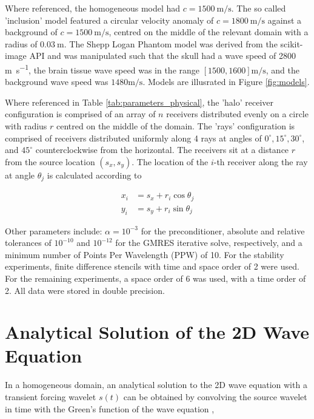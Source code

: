 \documentclass[final-report]{report-template}
\begin{document}
Where referenced, the homogeneous model had $c=\SI{1500}{\metre\per\second}$. The so called 'inclusion' model featured a circular velocity anomaly of $c=\SI{1800}{\metre\per\second}$ against a background of $c=\SI{1500}{\metre\per\second}$, centred on the middle of the relevant domain with a radius of $\SI{0.03}{\metre}$. The Shepp Logan Phantom model was derived from the scikit-image \cite{waltScikitimageImageProcessing2014} API and was manipulated such that the skull had a wave speed of 2800 \si{\metre\per\second}, the brain tissue wave speed was in the range $[1500, 1600] \si{\metre\per\second}$, and the background wave speed was $1480 \si{\metre\per\second}$. Models are illusrated in Figure \ref{fig:models}.

Where referenced in Table \ref{tab:parameters_physical}, the 'halo' receiver configuration is comprised of an array of $n$ receivers distributed evenly on a circle with radius $r$ centred on the middle of the domain. The 'rays' configuration is comprised of receivers distributed uniformly along 4 rays at angles of $0^{\circ}, 15^{\circ}, 30^{\circ}$, and $45^{\circ}$ counterclockwise from the horizontal. The receivers sit at a distance $r$ from the source location $(s_x, s_y)$. The location of the $i$-th receiver along the ray at angle $\theta_j$ is calculated according to

\begin{align*}
    x_i &= s_x + r_i\cos{\theta_j}\\
    y_i &= s_y + r_i \sin{\theta_j}
\end{align*}

Other parameters include: $\alpha = 10^{-3}$ for the preconditioner, absolute and relative tolerances of $10^{-10}$ and $10^{-12}$ for the GMRES iterative solve, respectively, and a minimum number of Points Per Wavelength (PPW) of 10. For the stability experiments,  finite difference stencils with time and space order of 2 were used. For the remaining experiments, a space order of 6 was used, with a time order of 2. All data were stored in double precision.

\section{Analytical Solution of the 2D Wave Equation}
\label{app:conv_reduct}

In a homogeneous domain, an analytical solution to the 2D wave equation with a transient forcing wavelet $s(t)$ can be obtained by convolving the source wavelet in time with the Green's function of the wave equation \cite{wapenaarMultipleReflectionsHuygens2025},
\end{document}
